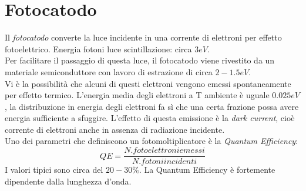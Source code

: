\documentclass[12pt, letterpaper]{book}
\begin{document}
\section{Fotocatodo}
Il \textit{fotocatodo} converte la luce incidente in una corrente di elettroni per effetto fotoelettrico.
Energia fotoni luce scintillazione: circa $3 eV$.\\
Per facilitare il passaggio di questa luce, il fotocatodo viene rivestito da un materiale semiconduttore con lavoro di estrazione di circa $2-1.5eV$.\\
Vi è la possibilità che alcuni di questi elettroni vengono emessi spontaneamente per effetto termico. L'energia media degli elettroni a T ambiente è uguale $0.025 eV$, la distribuzione in energia degli elettroni fa sì che una certa frazione possa avere energia sufficiente a sfuggire. L'effetto di questa emissione è la \textit{dark current}, cioè corrente di elettroni anche in assenza di 
radiazione incidente.\\
Uno dei parametri che definiscono un fotomoltiplicatore è la \textit{Quantum Efficiency}:
$$QE=\frac{N. fotoelettroni emessi}{N. fotoni incidenti}$$
I valori tipici sono circa del $20-30\%$. La Quantum Efficiency è fortemente dipendente dalla lunghezza d’onda.
\end{document}
